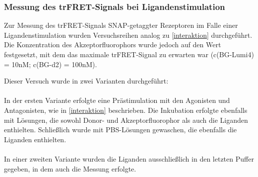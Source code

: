 \subsubsection{Messung des trFRET-Signals bei Ligandenstimulation}

Zur Messung des trFRET-Signals SNAP-getaggter Rezeptoren im Falle einer Ligandenstimulation wurden Versuchsreihen analog zu \ref{interaktion} durchgeführt. Die Konzentration des Akzeptorfluorophors wurde jedoch auf den Wert festgesetzt, mit dem das maximale trFRET-Signal zu erwarten war (c(BG-Lumi4) = 10\si{\nano M}; c(BG-d2) = 100\si{\nano M}).

Dieser Versuch wurde in zwei Varianten durchgeführt:
\\ \\
In der ersten Variante erfolgte eine Prästimulation mit den Agonisten und Antagonisten, wie in \ref{interaktion} beschrieben. Die Inkubation erfolgte ebenfalls mit Lösungen, die sowohl Donor- und Akzeptorfluorophor als auch die Liganden enthielten. Schließlich wurde mit PBS-Lösungen gewaschen, die ebenfalls die Liganden enthielten.
\\ \\
In einer zweiten Variante wurden die Liganden ausschließlich in den letzten Puffer gegeben, in dem auch die Messung erfolgte.

